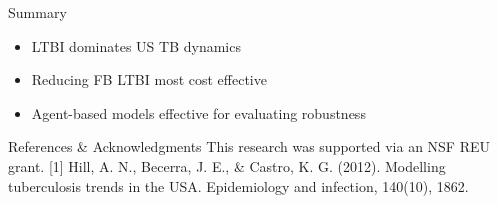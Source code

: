 \documentclass[final]{beamer}
\begin{document}
\begin{frame}
\begin{columns}[T]
\begin{column}{.3\textwidth}
      \vspace{.33em}
      \begin{block}{Summary}
        \begin{itemize}
          \item LTBI dominates US TB dynamics
          \item Reducing FB LTBI most cost effective
          \item Agent-based models effective for evaluating robustness
        \end{itemize}
      \end{block}
      \vspace{.33em}
      \begin{block}{References \& Acknowledgments}
        This research was supported via an NSF REU grant. 
        \small{[1] Hill, A. N., Becerra, J. E., \& Castro, K. G. (2012). Modelling
          tuberculosis trends in the USA. Epidemiology and infection, 140(10),
          1862.}
      \end{block}
      
    \end{column}
  \end{columns}
\end{frame}
\end{document}
